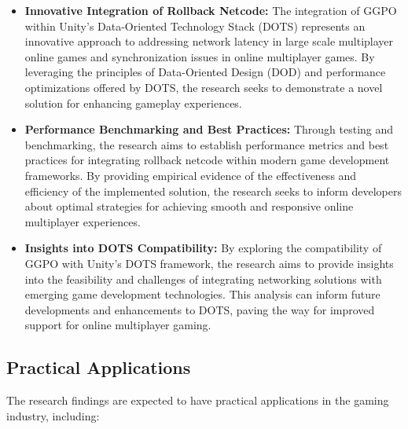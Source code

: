 \begin{itemize}
    \item \textbf{Innovative Integration of Rollback Netcode:} The integration of GGPO within Unity's Data-Oriented Technology Stack (DOTS) represents an innovative approach to addressing network latency in large scale multiplayer online games and synchronization issues in online multiplayer games. By leveraging the principles of Data-Oriented Design (DOD) and performance optimizations offered by DOTS, the research seeks to demonstrate a novel solution for enhancing gameplay experiences.
    
    \item \textbf{Performance Benchmarking and Best Practices:} Through testing and benchmarking, the research aims to establish performance metrics and best practices for integrating rollback netcode within modern game development frameworks. By providing empirical evidence of the effectiveness and efficiency of the implemented solution, the research seeks to inform developers about optimal strategies for achieving smooth and responsive online multiplayer experiences.
    
    \item \textbf{Insights into DOTS Compatibility:} By exploring the compatibility of GGPO with Unity's DOTS framework, the research aims to provide insights into the feasibility and challenges of integrating networking solutions with emerging game development technologies. This analysis can inform future developments and enhancements to DOTS, paving the way for improved support for online multiplayer gaming.
\end{itemize}

\subsection{Practical Applications}

The research findings are expected to have practical applications in the gaming industry, including:

